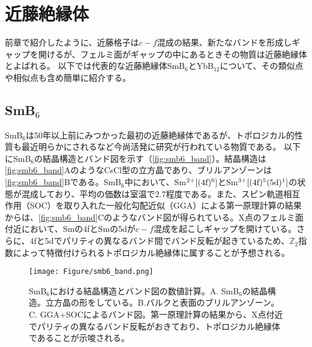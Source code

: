 \chapter{近藤絶縁体}\label{sec:Kondo_ins}
前章で紹介したように、近藤格子は$c-f$混成の結果、新たなバンドを形成しギャップを開けるが、フェルミ面がギャップの中にあるときその物質は近藤絶縁体とよばれる。
以下では代表的な近藤絶縁体SmB$_{6}$とYbB$_{12}$について、その類似点や相似点も含め簡単に紹介する。
\section{SmB\texorpdfstring{$_{6}$}{Lg}}
SmB$_{6}$は50年以上前にみつかった最初の近藤絶縁体であるが\cite{first_KondoIns_smb6}、トポロジカル的性質も最近明らかにされるなど今尚活発に研究が行われている物質である。
以下にSmB$_6$の結晶構造とバンド図を示す\cite{kang2015band}（\autoref{fig:smb6_band}）。結晶構造は\autoref{fig:smb6_band}AのようなCsCl型の立方晶であり、ブリルアンゾーンは\autoref{fig:smb6_band}Bである。SmB$_6$中において、Sm$^{2+}[(4\rm{f})^6]$とSm$^{3+}[(4\rm{f})^5(5\rm{d})^1]$の状態が混成しており、平均の価数は室温で2.7程度である\cite{smb6_valence}。また、スピン軌道相互作用（SOC）を取り入れた一般化勾配近似（GGA）による第一原理計算の結果からは、\autoref{fig:smb6_band}Cのようなバンド図が得られている。X点のフェルミ面付近において、Smの4fとSmの5dが$c-f$混成を起こしギャップを開けている。さらに、4fと5dでパリティの異なるバンド間でバンド反転が起きているため、$\mathbb{Z}_2$指数によって特徴付けられるトポロジカル絶縁体に属することが予想される。
\begin{figure*}[!thb]
	\begin{center}
		\texttt{[image: Figure/smb6\_band.png]}
\caption{SmB$_6$における結晶構造とバンド図の数値計算\cite{kang2015band}。A. SmB$_6$の結晶構造。立方晶の形をしている。B.バルクと表面のブリルアンゾーン。C. GGA+SOCによるバンド図。第一原理計算の結果から、X点付近でパリティの異なるバンド反転がおきており、トポロジカル絶縁体であることが示唆される。}
\label{fig:smb6_band}
    \end{center}
\end{figure*}

